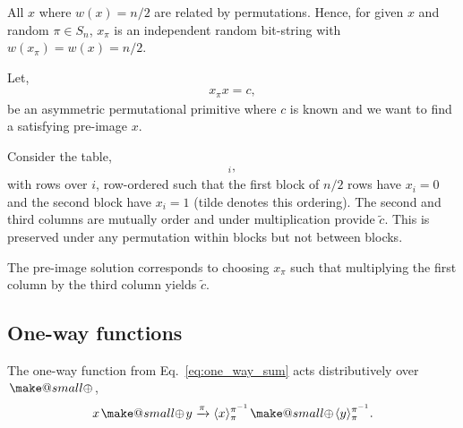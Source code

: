 \documentclass[twocolumn, aps, amsmath, amssymb, nofootinbib, superscriptaddress, longbibliography, doublefloatfix, table-of-contents, eqsecnum, rmp]{revtex4-2}
\makeatletter
\def\braid#1#2#3#4{\langle#1,#2\rangle_{#3}^{#4}}
\def\selfbraid#1#2#3{\langle#1\rangle_{#2}^{#3}}
\def\comm#1#2#3#4{[#1,#2]_{#3}^{#4}}
\newcommand{\soplus}{{{\hspace{1pt}}{\mathbin{\mathpalette\make@small{\mathbin\oplus}}}}{\hspace{1pt}}}
\newcommand{\make@small}[2]{%
  \vcenter{\hbox{%
    \scalebox{0.6}{$\m@th#1#2$}%
  }}%
}
\makeatother
\begin{document}
All $x$ where $w(x)=n/2$ are related by permutations. Hence, for given $x$ and random $\pi\in S_n$, $x_\pi$ is an independent random bit-string with $w(x_\pi)=w(x)=n/2$.

Let,
\begin{align}
	x_\pi x = c,
\end{align}
be an asymmetric permutational primitive where $c$ is known and we want to find a satisfying pre-image $x$.

Consider the table,
\begin{align}
	[x_\pi,\tilde{x},\tilde{x}\soplus \tilde{c}]_i,
\end{align}
with rows over $i$, row-ordered such that the first block of $n/2$ rows have $x_i=0$ and the second block have $x_i=1$ (tilde denotes this ordering). The second and third columns are mutually order and under multiplication provide $\tilde{c}$. This is preserved under any permutation within blocks but not between blocks.

The pre-image solution corresponds to choosing $x_\pi$ such that multiplying the first column by the third column yields $\tilde{c}$.

\subsection{One-way functions}

The one-way function from Eq.~\eqref{eq:one_way_sum} acts distributively over $\soplus$,
\begin{align}
	x\soplus y \xrightarrow{\pi} \selfbraid{x}{\pi}{\pi^{-1}} \soplus \selfbraid{y}{\pi}{\pi^{-1}}.
\end{align}

\end{document}

